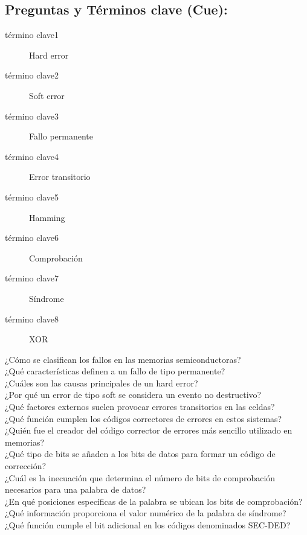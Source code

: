 \documentclass{article}
\begin{document}
\subsection{Preguntas y Términos clave (Cue):}
\label{sec:orgc6f84ff}
\begin{description}
\item[{término clave1}] Hard error
\item[{término clave2}] Soft error
\item[{término clave3}] Fallo permanente
\item[{término clave4}] Error transitorio
\item[{término clave5}] Hamming
\item[{término clave6}] Comprobación
\item[{término clave7}] Síndrome
\item[{término clave8}] XOR
\item[{¿Cómo se clasifican los fallos en las memorias semiconductoras?}] 

\item[{¿Qué características definen a un fallo de tipo permanente?}] 

\item[{¿Cuáles son las causas principales de un hard error?}] 

\item[{¿Por qué un error de tipo soft se considera un evento no destructivo?}] 

\item[{¿Qué factores externos suelen provocar errores transitorios en las celdas?}] 

\item[{¿Qué función cumplen los códigos correctores de errores en estos sistemas?}] 

\item[{¿Quién fue el creador del código corrector de errores más sencillo utilizado en memorias?}] 

\item[{¿Qué tipo de bits se añaden a los bits de datos para formar un código de corrección?}] 

\item[{¿Cuál es la inecuación que determina el número de bits de comprobación necesarios para una palabra de datos?}] 

\item[{¿En qué posiciones específicas de la palabra se ubican los bits de comprobación?}] 

\item[{¿Qué información proporciona el valor numérico de la palabra de síndrome?}] 

\item[{¿Qué función cumple el bit adicional en los códigos denominados SEC-DED?}] 
\end{description}
\end{document}
